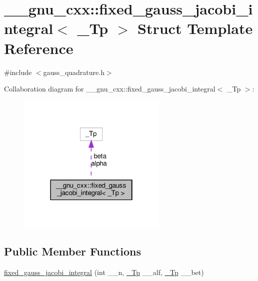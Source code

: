 \hypertarget{struct____gnu__cxx_1_1fixed__gauss__jacobi__integral}{}\section{\+\_\+\+\_\+gnu\+\_\+cxx\+:\+:fixed\+\_\+gauss\+\_\+jacobi\+\_\+integral$<$ \+\_\+\+Tp $>$ Struct Template Reference}
\label{struct____gnu__cxx_1_1fixed__gauss__jacobi__integral}


{\ttfamily \#include $<$gauss\+\_\+quadrature.\+h$>$}



Collaboration diagram for \+\_\+\+\_\+gnu\+\_\+cxx\+:\+:fixed\+\_\+gauss\+\_\+jacobi\+\_\+integral$<$ \+\_\+\+Tp $>$\+:
\nopagebreak
\begin{figure}[H]
\begin{center}
\leavevmode
\includegraphics[width=202pt]{struct____gnu__cxx_1_1fixed__gauss__jacobi__integral__coll__graph}
\end{center}
\end{figure}
\subsection*{Public Member Functions}
\begin{DoxyCompactItemize}
\item 
\hyperlink{struct____gnu__cxx_1_1fixed__gauss__jacobi__integral_a2ee234de6447ed621c4199beb169126b}{fixed\+\_\+gauss\+\_\+jacobi\+\_\+integral} (int \+\_\+\+\_\+n, \hyperlink{namespace____gnu__cxx_a3b19a9c800ca194374ef9172290f7d79}{\+\_\+\+Tp} \+\_\+\+\_\+alf, \hyperlink{namespace____gnu__cxx_a3b19a9c800ca194374ef9172290f7d79}{\+\_\+\+Tp} \+\_\+\+\_\+bet)
\end{DoxyCompactItemize}
